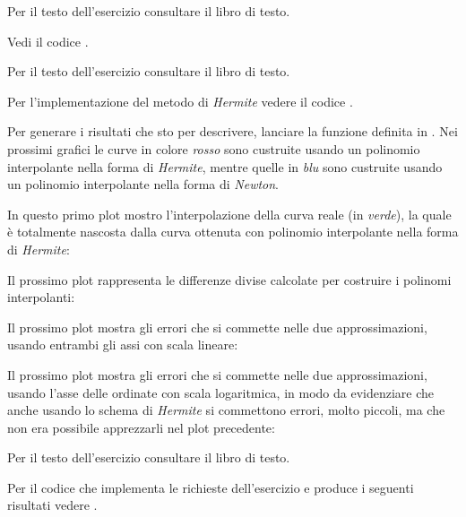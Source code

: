 \begin{exercise}[4.8]
Per il testo dell'esercizio consultare il libro di testo.
\end{exercise}
Vedi il codice . 

\begin{exercise}[4.9]
Per il testo dell'esercizio consultare il libro di testo.
\end{exercise}
Per l'implementazione del metodo di \emph{Hermite} vedere il codice
.

Per generare i risultati
che sto per descrivere, lanciare la funzione definita in
. 
Nei prossimi grafici le curve in colore \emph{rosso} sono custruite usando un
polinomio interpolante nella forma di \emph{Hermite}, mentre quelle in
\emph{blu} sono custruite usando un polinomio interpolante nella forma di
\emph{Newton}.

In questo primo plot mostro l'interpolazione della curva reale (in
\emph{verde}), la quale \`e totalmente nascosta dalla curva ottenuta con
polinomio interpolante nella forma di \emph{Hermite}:
\begin{center} 

\end{center}

Il prossimo plot rappresenta le differenze divise calcolate per costruire i
polinomi interpolanti:
\begin{center} 

\end{center}

Il prossimo plot mostra gli errori che si commette nelle due approssimazioni,
usando entrambi gli assi con scala lineare:
\begin{center} 

\end{center}

Il prossimo plot mostra gli errori che si commette nelle due approssimazioni,
usando l'asse delle ordinate con scala logaritmica, in modo da evidenziare che
anche usando lo schema di \emph{Hermite} si commettono errori, molto piccoli,
ma che non era possibile apprezzarli nel plot precedente:
\begin{center} 

\end{center}

\begin{exercise}[4.11]
\label{exercise:exercise411}
Per il testo dell'esercizio consultare il libro di testo.
\end{exercise}
Per il codice che implementa le richieste dell'esercizio e produce i seguenti
risultati vedere .

